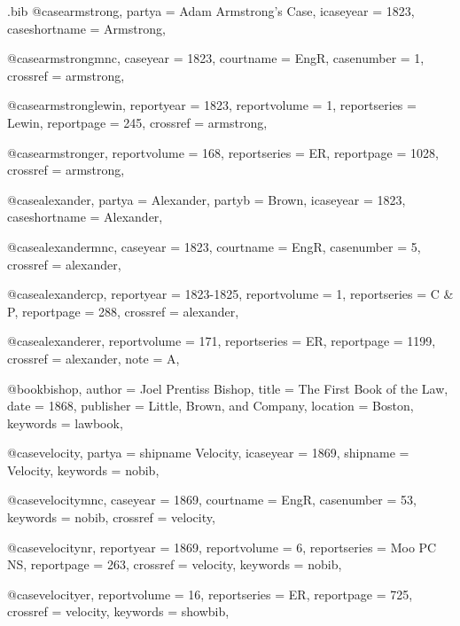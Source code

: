 \begin{filecontents*}[overwrite]{\jobname.bib}
@case{armstrong,
  partya = {Adam Armstrong's Case},
  icaseyear = {1823},
  caseshortname = {Armstrong},
}

@case{armstrongmnc,
  caseyear = {1823},
  courtname = {EngR},
  casenumber = {1},
  crossref = {armstrong},
}


@case{armstronglewin,
  reportyear = {1823},
  reportvolume = {1},
  reportseries = {Lewin},
  reportpage = {245},
  crossref = {armstrong},
}

@case{armstronger,
  reportvolume = {168},
  reportseries = {ER},
  reportpage = {1028},
  crossref = {armstrong},
}




@case{alexander,
  partya = {Alexander},
  partyb = {Brown},
  icaseyear = {1823},
  caseshortname = {Alexander},
}

@case{alexandermnc,
  caseyear = {1823},
  courtname = {EngR},
  casenumber = {5},
  crossref = {alexander},
}


@case{alexandercp,
  reportyear = {1823-1825},
  reportvolume = {1},
  reportseries = {C \& P},
  reportpage = {288},
  crossref = {alexander},
}

@case{alexanderer,
  reportvolume = {171},
  reportseries = {ER},
  reportpage = {1199},
  crossref = {alexander},
  note = {A},
}




@book{bishop,
author = {Joel Prentiss Bishop},
title = {The First Book of the Law},
date = {1868},
publisher = {Little, Brown, and Company},
location = {Boston},
keywords = {lawbook},
}


@case{velocity,
  partya = {shipname Velocity},
  icaseyear = {1869},
  shipname = {Velocity},
  keywords = {nobib},
}

@case{velocitymnc,
  caseyear = {1869},
  courtname = {EngR},
  casenumber = {53},
  keywords = {nobib},
  crossref = {velocity},
}


@case{velocitynr,
  reportyear = {1869},
  reportvolume = {6},
  reportseries = {Moo PC NS},
  reportpage = {263},
  crossref = {velocity},
  keywords = {nobib},
}

@case{velocityer,
  reportvolume = {16},
  reportseries = {ER},
  reportpage = {725},
  crossref = {velocity},
  keywords = {showbib},
}



\end{filecontents*}

